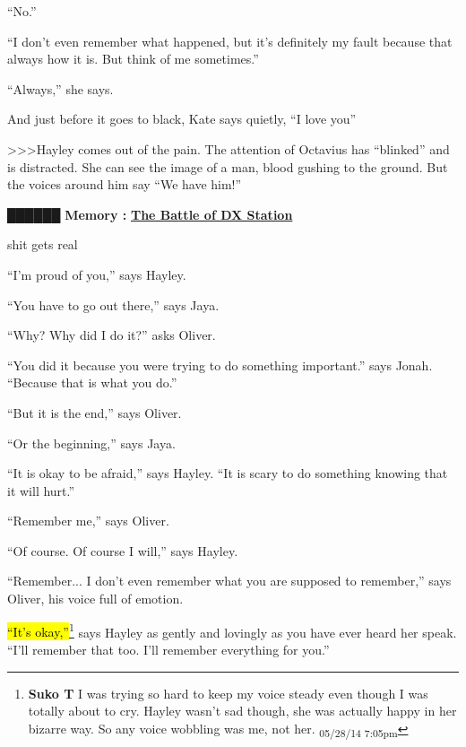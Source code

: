 ``No.''

``I don't even remember what happened, but it's definitely my fault because that always how it is.  But think of me sometimes.''

``Always,'' she says.



And just before it goes to black, Kate says quietly, ``I love you''



\textgreater \textgreater \textgreater  Hayley comes out of the pain.  The attention of Octavius has ``blinked'' and is distracted.  She can see the image of a man, blood gushing to the ground.  But the voices around him say ``We have him!''



 {\LARGE \textbf{ {\color[RGB]{51,51,51}██████} } }  {\LARGE \textbf{ Memory :} } \underline{  {\LARGE \textbf{ {\color[RGB]{17,85,204} The Battle of DX Station} } }  }

shit gets real



``I'm proud of you,'' says Hayley.



``You have to go out there,'' says Jaya.

``Why?  Why did I do it?'' asks Oliver.

``You did it because you were trying to do something important.'' says Jonah.  ``Because that is what you do.''

``But it is the end,'' says Oliver.

``Or the beginning,'' says Jaya.



``It is okay to be afraid,'' says Hayley.  ``It is scary to do something knowing that it will hurt.''



``Remember me,'' says Oliver.

``Of course.  Of course I will,'' says Hayley.

``Remember... I don't even remember what you are supposed to remember,'' says Oliver, his voice full of emotion.

\hl{``It's okay,''}\footnote{\textbf{Suko T }I was trying so hard to keep my voice steady even though I was totally about to cry.  Hayley wasn't sad though, she was actually happy in her bizarre way.  So any voice wobbling was me, not her. \textsubscript{05/28/14 7:05pm}} says Hayley as gently and lovingly as you have ever heard her speak.  ``I'll remember that too.  I'll remember everything for you.''

